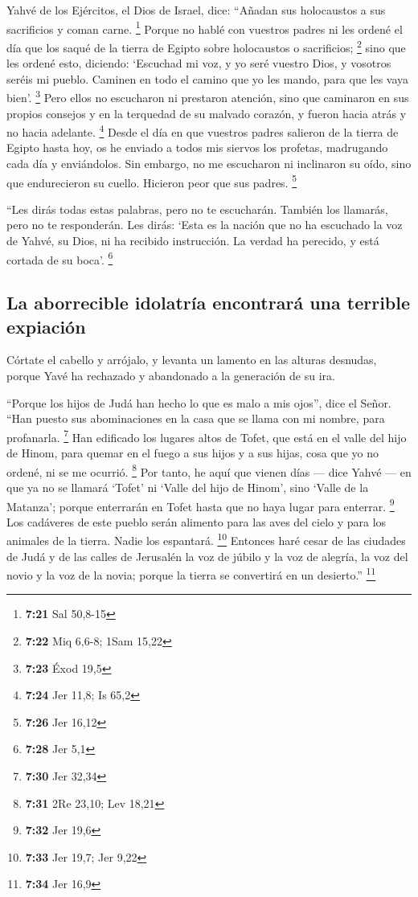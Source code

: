 Yahvé de los Ejércitos, el Dios de Israel, dice:
``Añadan sus holocaustos a sus sacrificios y coman carne. \footnote{\textbf{7:21}
  Sal 50,8-15}  Porque no hablé con vuestros padres ni
les ordené el día que los saqué de la tierra de Egipto sobre holocaustos
o sacrificios; \footnote{\textbf{7:22} Miq 6,6-8; 1Sam 15,22}
 sino que les ordené esto, diciendo: `Escuchad mi voz, y
yo seré vuestro Dios, y vosotros seréis mi pueblo. Caminen en todo el
camino que yo les mando, para que les vaya bien'. \footnote{\textbf{7:23}
  Éxod 19,5}  Pero ellos no escucharon ni prestaron
atención, sino que caminaron en sus propios consejos y en la terquedad
de su malvado corazón, y fueron hacia atrás y no hacia adelante.
\footnote{\textbf{7:24} Jer 11,8; Is 65,2}  Desde el día
en que vuestros padres salieron de la tierra de Egipto hasta hoy, os he
enviado a todos mis siervos los profetas, madrugando cada día y
enviándolos.  Sin embargo, no me escucharon ni inclinaron
su oído, sino que endurecieron su cuello. Hicieron peor que sus padres.
\footnote{\textbf{7:26} Jer 16,12}

 ``Les dirás todas estas palabras, pero no te escucharán.
También los llamarás, pero no te responderán.  Les dirás:
`Esta es la nación que no ha escuchado la voz de Yahvé, su Dios, ni ha
recibido instrucción. La verdad ha perecido, y está cortada de su boca'.
\footnote{\textbf{7:28} Jer 5,1}

\hypertarget{la-aborrecible-idolatruxeda-encontraruxe1-una-terrible-expiaciuxf3n}{%
\subsection{La aborrecible idolatría encontrará una terrible
expiación}\label{la-aborrecible-idolatruxeda-encontraruxe1-una-terrible-expiaciuxf3n}}

 Córtate el cabello y arrójalo, y levanta un lamento en
las alturas desnudas, porque Yavé ha rechazado y abandonado a la
generación de su ira.

 ``Porque los hijos de Judá han hecho lo que es malo a
mis ojos'', dice el Señor. ``Han puesto sus abominaciones en la casa que
se llama con mi nombre, para profanarla. \footnote{\textbf{7:30} Jer
  32,34}  Han edificado los lugares altos de Tofet, que
está en el valle del hijo de Hinom, para quemar en el fuego a sus hijos
y a sus hijas, cosa que yo no ordené, ni se me ocurrió. \footnote{\textbf{7:31}
  2Re 23,10; Lev 18,21}  Por tanto, he aquí que vienen
días --- dice Yahvé --- en que ya no se llamará `Tofet' ni `Valle del
hijo de Hinom', sino `Valle de la Matanza'; porque enterrarán en Tofet
hasta que no haya lugar para enterrar. \footnote{\textbf{7:32} Jer 19,6}
 Los cadáveres de este pueblo serán alimento para las
aves del cielo y para los animales de la tierra. Nadie los espantará.
\footnote{\textbf{7:33} Jer 19,7; Jer 9,22}  Entonces
haré cesar de las ciudades de Judá y de las calles de Jerusalén la voz
de júbilo y la voz de alegría, la voz del novio y la voz de la novia;
porque la tierra se convertirá en un desierto.'' \footnote{\textbf{7:34}
  Jer 16,9}

